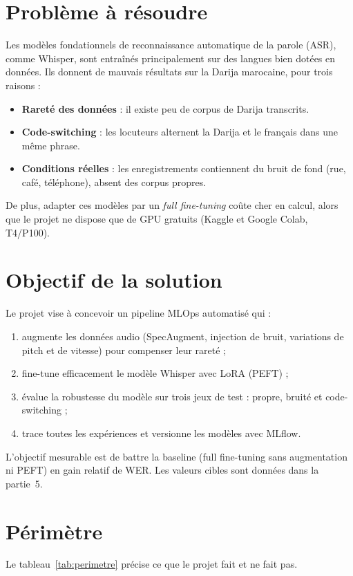 \documentclass[12pt,a4paper]{report}
\begin{document}
\section{Problème à résoudre}
Les modèles fondationnels de reconnaissance automatique de la parole (ASR), comme
Whisper, sont entraînés principalement sur des langues bien dotées en données. Ils
donnent de mauvais résultats sur la Darija marocaine, pour trois raisons :
\begin{itemize}
  \item \textbf{Rareté des données} : il existe peu de corpus de Darija transcrits.
  \item \textbf{Code-switching} : les locuteurs alternent la Darija et le français
        dans une même phrase.
  \item \textbf{Conditions réelles} : les enregistrements contiennent du bruit de fond
        (rue, café, téléphone), absent des corpus propres.
\end{itemize}
De plus, adapter ces modèles par un \emph{full fine-tuning} coûte cher en calcul,
alors que le projet ne dispose que de GPU gratuits (Kaggle et Google Colab, T4/P100).

\section{Objectif de la solution}
Le projet vise à concevoir un pipeline MLOps automatisé qui :
\begin{enumerate}
  \item augmente les données audio (SpecAugment, injection de bruit, variations de
        pitch et de vitesse) pour compenser leur rareté ;
  \item fine-tune efficacement le modèle Whisper avec LoRA (PEFT) ;
  \item évalue la robustesse du modèle sur trois jeux de test : propre, bruité et
        code-switching ;
  \item trace toutes les expériences et versionne les modèles avec MLflow.
\end{enumerate}
L'objectif mesurable est de battre la baseline (full fine-tuning sans augmentation
ni PEFT) en gain relatif de WER. Les valeurs cibles sont données dans la partie~5.

\section{Périmètre}
Le tableau~\ref{tab:perimetre} précise ce que le projet fait et ne fait pas.
\end{document}
